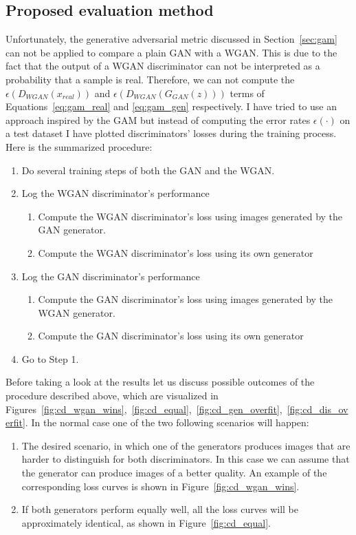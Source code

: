 \subsection{Proposed evaluation method}
Unfortunately, the generative adversarial metric discussed in Section~\ref{sec:gam} can not be applied to compare a plain GAN with a WGAN. This is due to the fact that the output of a WGAN discriminator can not be interpreted as a probability that a sample is real. Therefore, we can not compute the $\epsilon(D_{WGAN}(x_{real}))$ and $\epsilon(D_{WGAN}(G_{GAN}(z)))$ terms of Equations~\ref{eq:gam_real} and \ref{eq:gam_gen} respectively. I have tried to use an approach inspired by the GAM but instead of computing the error rates $\epsilon(\cdot)$ on a test dataset I have plotted discriminators' losses during the training process. Here is the summarized procedure: 
\begin{enumerate}
	\item Do several training steps of both the GAN and the WGAN.
	\item Log the WGAN discriminator's performance 
		\begin{enumerate}
			\item Compute the WGAN discriminator's loss using images generated by the GAN generator.
			\item Compute the WGAN discriminator's loss using its own generator
		\end{enumerate}	
	\item Log the GAN discriminator's performance
		\begin{enumerate}
			\item Compute the GAN discriminator's loss using images generated by the WGAN generator.
			\item Compute the GAN discriminator's loss using its own generator
		\end{enumerate}
	\item Go to Step 1.
\end{enumerate}
Before taking a look at the results let us discuss possible outcomes of the procedure described above, which are visualized in Figures~\ref{fig:cd_wgan_wins},~\ref{fig:cd_equal},~\ref{fig:cd_gen_overfit},~\ref{fig:cd_dis_overfit}. 
In the normal case one of the two following scenarios will happen:
\begin{enumerate}
	\item The desired scenario, in which one of the generators produces images that are harder to distinguish for both discriminators. In this case we can assume that the generator can produce images of a better quality. An example of the corresponding loss curves is shown in Figure~\ref{fig:cd_wgan_wins}.	
	\item If both generators perform equally well, all the loss curves will be approximately identical, as shown in Figure~\ref{fig:cd_equal}.
\end{enumerate}

